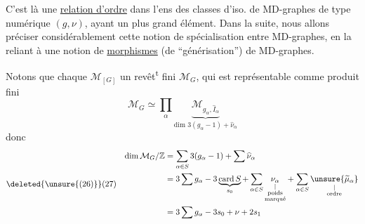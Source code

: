 C'est là une \uline{relation d'ordre} dans l'ens des classes d'iso. de MD-graphes de type numérique $(g,\nu)$, ayant un plus grand élément. Dans la suite, nous allons préciser considérablement cette notion de spécialisation entre MD-graphes, en la reliant à une notion de \uline{morphismes} (de ``générisation'') de MD-graphes.

Notons que chaque $\mathcal M_{[G]}$  un revêt\textsuperscript{t} fini $\mathcal M_G$, qui est représentable comme produit fini
\[
\mathcal M_G\simeq\prod_\alpha\underbrace{\mathcal M_{g_\alpha,\widehat I_\alpha}}_{\text{dim }3(g_\alpha-1)+\widehat\nu_\alpha}
\]
donc
\[
\deleted{\unsure{(26)}}(27)\quad\begin{aligned}
\dim\mathcal M_G/\mathbb Z&=\sum_{\alpha\in S}3(g_\alpha-1)+\sum\widehat\nu_\alpha\\
&=3\sum g_\alpha-3\underbrace{\operatorname{card}S}_{s_0}+\sum_{\alpha\in S}\underset{\substack{|\\\text{poids}\\\text{marqué}}}{\nu_\alpha}+\sum_{\alpha\in S}\underset{\substack{|\\\text{ordre}}}{\unsure{\widetilde\mu_\alpha}}\\
&=3\sum g_\alpha-3s_0+\nu+2s_1
\end{aligned}
\]
